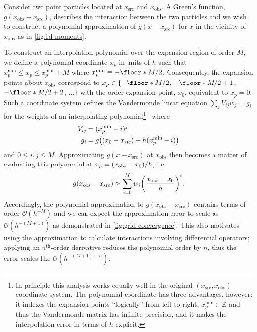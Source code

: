 Consider two point particles located at $x_\text{src}$ and $x_\text{obs}$. 
A Green's function, $g(x_\text{obs} - x_\text{src})$, describes the interaction between the two particles and we wish to construct a polynomial approximation of $g(x - x_\text{src})$ for $x$ in the vicinity of $x_\text{obs}$ as in \cref{fig:1d moments}.

To construct an interpolation polynomial over the expansion region of order $M$, we define a polynomial coordinate $x_p$ in units of $h$ such that $x_p^\text{min} \leqslant x_p \leqslant x_p^\text{min} + M$ where $x_p^\text{min} \equiv -\floor*{M/2}$.
Consequently, the expansion points about $x_\text{obs}$ correspond to $x_p \in \{-\floor*{M/2}$, $-\floor*{M/2} + 1$, $-\floor*{M/2} + 2$, $\ldots\}$ with the  order expansion point, $x_0$, equivalent to $x_p = 0$.
Such a coordinate system defines the Vandermonde linear equation $\sum_{j}V_{ij} w_j = g_i$ for the weights of an interpolating polynomial\footnote{In principle this analysis works equally well in the original $(x_\text{src}, x_\text{obs})$ coordinate system. The polynomial coordinate has three advantages, however: it indexes the expansion points ``logically'' from left to right, $x_p^\text{min} \in \mathbb{Z}$ and thus the Vandermonde matrix has infinite precision, and it makes the interpolation error in terms of $h$ explicit.}~\cite{NumericalRecipes} where
\begin{subequations}
  \begin{align}
    V_{ij} &= (x_p^\text{min} + i)^j \\
    g_i &= g\qty((x_0 - x_\text{src}) + h(x_p^\text{min} + i))
  \end{align}
\end{subequations}
and $0 \leqslant i, j \leqslant M$.
Approximating $g(x - x_\text{src})$ at $x_\text{obs}$ then becomes a matter of evaluating this polynomial at $x_p = \qty(x_\text{obs} - x_0)/h$, i.e.
\begin{equation}
  g(x_\text{obs} - x_\text{src}) \approx \sum_{i = 0}^{M} w_i \qty(\frac{x_\text{obs} - x_0}{h})^i.
\end{equation}
Accordingly, the polynomial approximation to $g(x_\text{obs} - x_\text{src})$ contains terms of order $\mathcal{O}(h^{-M})$ and we can expect the approximation error to scale as $\mathcal{O}(h^{-(M + 1)})$ as demonstrated in \cref{fig:grid convergence}.
This also motivates using the approximation to calculate interactions involving differential operators; applying an $n^\text{th}$-order derivative reduces the polynomial order by $n$, thus the error scales like $\mathcal{O}(h^{-(M + 1) + n})$.

